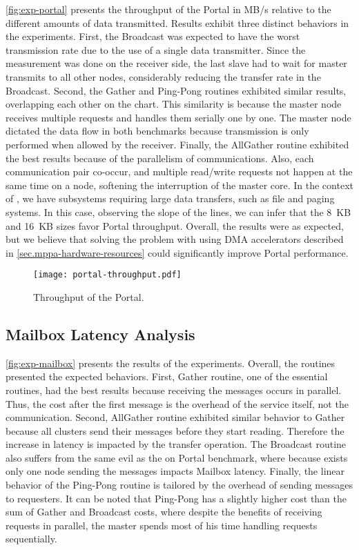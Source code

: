 			\autoref{fig:exp-portal} presents the throughput of the Portal in MB/s
			relative to the different amounts of data transmitted. Results exhibit
			three distinct behaviors in the experiments. First, the Broadcast was
			expected to have the worst transmission rate due to the use of a single
			data transmitter. Since the measurement was done on the receiver side,
			the last slave had to wait for master transmits to all other nodes,
			considerably reducing the transfer rate in the Broadcast. Second, the
			Gather and Ping-Pong routines exhibited similar results, overlapping
			each other on the chart. This similarity is because the master node
			receives multiple requests and handles them serially one by one.
			The master node dictated the data flow in both benchmarks because
			transmission is only performed when allowed by the receiver. Finally,
			the AllGather routine exhibited the best results because of the
			parallelism of communications. Also, each communication pair co-occur,
			and multiple read/write requests not happen at the same time on a node,
			softening the interruption of the master core. In the context of \oss,
			we have subsystems requiring large data transfers, such as file and
			paging systems. In this case, observing the slope of the lines,
			we can infer that the 8~KB and 16~KB sizes favor Portal throughput.
			Overall, the results were as expected, but we believe that solving
			the problem with using DMA accelerators described in
			\autoref{sec.mppa-hardware-resources} could significantly improve
			Portal performance.

			\begin{figure}[!tb]
				\centering%
				\caption{Throughput of the Portal.}%
				\label{fig:exp-portal}%
				\texttt{[image: portal-throughput.pdf]}%
			\end{figure}

		\subsection{Mailbox Latency Analysis}

			\autoref{fig:exp-mailbox} presents the results of the experiments.
			Overall, the routines presented the expected behaviors.
			First, Gather routine, one of the essential routines, had the best
			results because receiving the messages occurs in parallel. Thus,
			the cost after the first message is the overhead of the service
			itself, not the communication. Second, AllGather routine exhibited
			similar behavior to Gather because all clusters send their messages
			before they start reading. Therefore the increase in latency is
			impacted by the transfer operation. The Broadcast routine also
			suffers from the same evil as the on Portal benchmark, where because
			exists only one node sending the messages impacts Mailbox latency.
			Finally, the linear behavior of the Ping-Pong routine is tailored
			by the overhead of sending messages to requesters. It can be noted
			that Ping-Pong has a slightly higher cost than the sum of Gather
			and Broadcast costs, where despite the benefits of receiving
			requests in parallel, the master spends most of his time handling
			requests sequentially.

